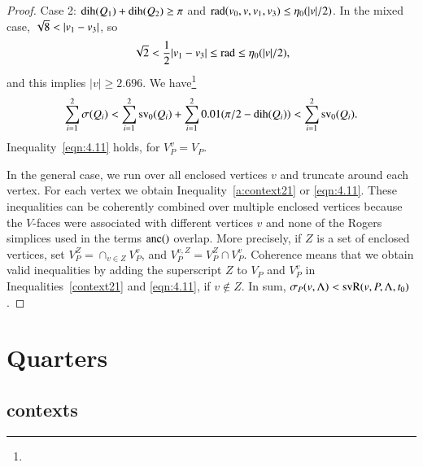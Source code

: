 \begin{proof}
\noindent Case 2:  $\operatorname{dih}(Q_1)+\operatorname{dih}(Q_2)\ge\pi$ and
    $\operatorname{rad}(v_0,v,v_1,v_3)\le \eta_0(|v|/2)$.
 In the mixed case,
$\sqr8<|v_1-v_3|$, so
$$\sqrt2<{\frac{1}{2}}|v_1-v_3|\le\operatorname{rad} \le \eta_0(|v|/2),$$
and this implies $|v|\ge 2.696$. We
have\footnote{}
$$\sum_{i=1}^2 \sigma(Q_i) < \sum_{i=1}^2 {\operatorname{sv}}_0(Q_i) +
\sum_{i=1}^2 0.01(\pi/2-\operatorname{dih}(Q_i))< \sum_{i=1}^2 {\operatorname{sv}}_0(Q_i).$$
Inequality~\ref{eqn:4.11} holds, for $V_P^v=V_P$.

In the general case, we run over all enclosed vertices $v$ and
truncate around each vertex.  For each vertex we obtain
Inequality~\ref{a:context21} or \ref{eqn:4.11}. These inequalities can
be coherently combined over multiple enclosed vertices because the
$V$-faces were associated with different vertices $v$ and none of
the Rogers simplices used in the terms $\operatorname{anc}()$ overlap. More
precisely, if $Z$ is a set of enclosed vertices, set $V_P^Z =
\cap_{v\in Z} V_P^v$, and $V_P^{v,Z} = V_P^Z\cap V_P^v$. Coherence
means that we obtain valid inequalities by adding the superscript
$Z$ to $V_P$ and $V_P^v$ in Inequalities~\ref{context21} and
\ref{eqn:4.11}, if $v\not\in Z$. In sum,
    $\sigma_P(v,\Lambda) < {\operatorname{svR}}(v,P,\Lambda,t_0)$.
%
\end{proof}



\section{Quarters} %
    \label{sec:upright}







\subsection{contexts} %

